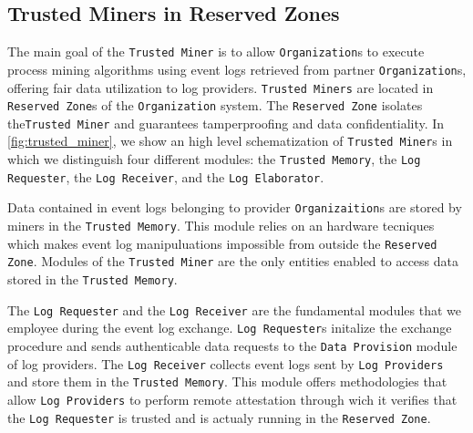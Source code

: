 \subsection{Trusted Miners in Reserved Zones}
The main goal of the \texttt{Trusted Miner} is to allow \texttt{Organization}s to execute process mining algorithms using %
event logs retrieved from partner \texttt{Organization}s, offering fair data utilization to log providers. \texttt{Trusted Miners} are located in \texttt{Reserved Zone}s of the \texttt{Organization} system. The \texttt{Reserved Zone} isolates the\texttt{Trusted Miner} and guarantees tamperproofing and data confidentiality. In \cref{fig:trusted_miner}, we show an high level schematization of \texttt{Trusted Miner}s in which we distinguish four different modules: the \texttt{Trusted Memory}, the \texttt{Log Requester}, the \texttt{Log Receiver}, and the \texttt{Log Elaborator}.

Data contained in event logs belonging to provider \texttt{Organizaition}s are stored by miners in the \texttt{Trusted Memory}. This module relies on an hardware tecniques which makes event log manipuluations impossible from outside the \texttt{Reserved Zone}. Modules of the \texttt{Trusted Miner} are the only entities enabled to access data stored in the \texttt{Trusted Memory}. %

The \texttt{Log Requester} and the \texttt{Log Receiver} are the fundamental modules that we employee during the event log exchange. \texttt{Log Requester}s initalize the exchange procedure and sends authenticable data requests to the \texttt{Data Provision} module of log providers. The \texttt{Log Receiver} collects event logs sent by \texttt{Log Providers} and store them in the \texttt{Trusted Memory}. This module offers methodologies that allow \texttt{Log Providers} to perform remote attestation through wich it verifies that the \texttt{Log Requester} is trusted and is actualy running in the \texttt{Reserved Zone}.%


